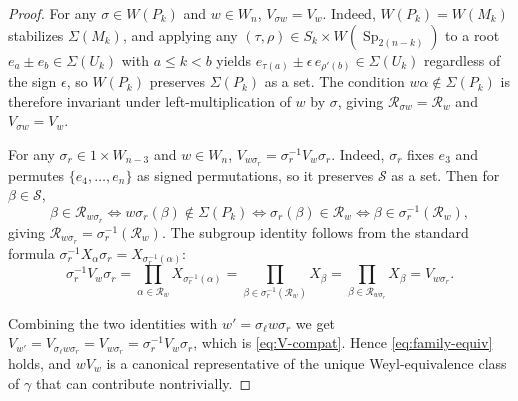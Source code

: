 \documentclass[11pt,notitlepage]{amsart}
\theoremstyle{definition}
\theoremstyle{remark}
\newcommand{\calR}{\mathcal{R}}
\newcommand{\calS}{\mathcal{S}}
\DeclareMathOperator{\Sp}{Sp}
\begin{document}
\begin{proof}
For any $\sigma \in W(P_k)$ and $w \in W_n$, $V_{\sigma w} = V_w$. Indeed, $W(P_k) = W(M_k)$ stabilizes $\Sigma(M_k)$, and applying any $(\tau, \rho) \in S_k \times W(\Sp_{2(n-k)})$ to a root $e_a \pm e_b \in \Sigma(U_k)$ with $a \leq k < b$ yields $e_{\tau(a)} \pm \epsilon\, e_{\rho'(b)} \in \Sigma(U_k)$ regardless of the sign $\epsilon$, so $W(P_k)$ preserves $\Sigma(P_k)$ as a set. The condition $w \alpha \notin \Sigma(P_k)$ is therefore invariant under left-multiplication of $w$ by $\sigma$, giving $\calR_{\sigma w} = \calR_w$ and $V_{\sigma w} = V_w$.

For any $\sigma_r \in 1 \times W_{n-3}$ and $w \in W_n$, $V_{w \sigma_r} = \sigma_r^{-1} V_w \sigma_r$. Indeed, $\sigma_r$ fixes $e_3$ and permutes $\{e_4, \ldots, e_n\}$ as signed permutations, so it preserves $\calS$ as a set. Then for $\beta \in \calS$,
\[
    \beta \in \calR_{w \sigma_r} \iff w \sigma_r(\beta) \notin \Sigma(P_k) \iff \sigma_r(\beta) \in \calR_w \iff \beta \in \sigma_r^{-1}(\calR_w),
\]
giving $\calR_{w \sigma_r} = \sigma_r^{-1}(\calR_w)$. The subgroup identity follows from the standard formula $\sigma_r^{-1} X_\alpha \sigma_r = X_{\sigma_r^{-1}(\alpha)}$:
\[
    \sigma_r^{-1} V_w \sigma_r = \prod_{\alpha \in \calR_w} X_{\sigma_r^{-1}(\alpha)} = \prod_{\beta \in \sigma_r^{-1}(\calR_w)} X_\beta = \prod_{\beta \in \calR_{w \sigma_r}} X_\beta = V_{w \sigma_r}.
\]

Combining the two identities with $w' = \sigma_\ell w \sigma_r$ we get $V_{w'} = V_{\sigma_\ell w \sigma_r} = V_{w \sigma_r} = \sigma_r^{-1} V_w \sigma_r$, which is \eqref{eq:V-compat}. Hence \eqref{eq:family-equiv} holds, and $w V_w$ is a canonical representative of the unique Weyl-equivalence class of $\gamma$ that can contribute nontrivially.
\end{proof}
\end{document}
